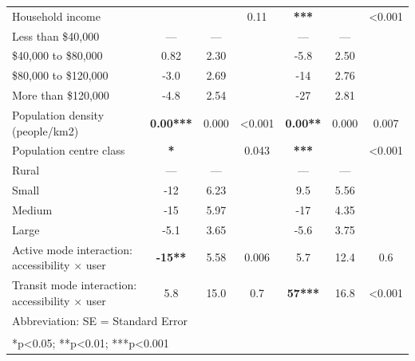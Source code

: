 \documentclass[preprint, 3p,
authoryear]{elsarticle} %
\begin{document}
\begin{table}
\begin{tabular}[t]{lcccccc}
\addlinespace
Household income &  &  & 0.11 & \textbf{***} &  & <0.001\\
\hspace{1em}Less than \$40,000 & — & — &  & — & — & \\
\hspace{1em}\$40,000 to \$80,000 & 0.82 & 2.30 &  & -5.8 & 2.50 & \\
\hspace{1em}\$80,000 to \$120,000 & -3.0 & 2.69 &  & -14 & 2.76 & \\
\hspace{1em}More than \$120,000 & -4.8 & 2.54 &  & -27 & 2.81 & \\
\addlinespace
Population density (people/km2) & \textbf{0.00***} & 0.000 & <0.001 & \textbf{0.00**} & 0.000 & 0.007\\
Population centre class & \textbf{*} &  & 0.043 & \textbf{***} &  & <0.001\\
\hspace{1em}Rural & — & — &  & — & — & \\
\hspace{1em}Small & -12 & 6.23 &  & 9.5 & 5.56 & \\
\hspace{1em}Medium & -15 & 5.97 &  & -17 & 4.35 & \\
\addlinespace
\hspace{1em}Large & -5.1 & 3.65 &  & -5.6 & 3.75 & \\
Active mode interaction: accessibility × user & \textbf{-15**} & 5.58 & 0.006 & 5.7 & 12.4 & 0.6\\
Transit mode interaction: accessibility × user & 5.8 & 15.0 & 0.7 & \textbf{57***} & 16.8 & <0.001\\
\bottomrule
\multicolumn{7}{l}{\rule{0pt}{1em}Abbreviation: SE = Standard Error}\\
\multicolumn{7}{l}{\textsuperscript{} *p<0.05; **p<0.01; ***p<0.001}\\
\end{tabular}
\end{table}

\renewcommand{\thetable}{A.4}
\end{document}
